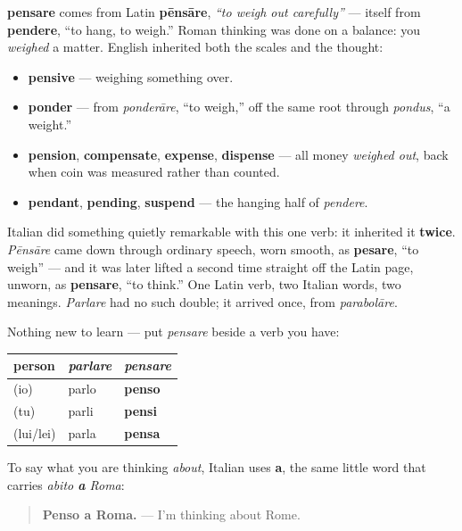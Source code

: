 \begin{cousinweb}
\textbf{pensare} comes from Latin \textbf{pēnsāre}, \emph{\textquotedblleft{}to weigh out carefully\textquotedblright{}} — itself from \textbf{pendere}, \textquotedblleft{}to hang, to weigh.\textquotedblright{} Roman thinking was done on a balance: you \emph{weighed} a matter. English inherited both the scales and the thought:

\begin{itemize}
\raggedright
  \item \textbf{pensive} — weighing something over.
  \item \textbf{ponder} — from \emph{ponderāre}, \textquotedblleft{}to weigh,\textquotedblright{} off the same root through \emph{pondus}, \textquotedblleft{}a weight.\textquotedblright{}
  \item \textbf{pension}, \textbf{compensate}, \textbf{expense}, \textbf{dispense} — all money \emph{weighed out}, back when coin was measured rather than counted.
  \item \textbf{pendant}, \textbf{pending}, \textbf{suspend} — the hanging half of \emph{pendere}.
\end{itemize}

Italian did something quietly remarkable with this one verb: it inherited it \textbf{twice}. \emph{Pēnsāre} came down through ordinary speech, worn smooth, as \textbf{pesare}, \textquotedblleft{}to weigh\textquotedblright{} — and it was later lifted a second time straight off the Latin page, unworn, as \textbf{pensare}, \textquotedblleft{}to think.\textquotedblright{} One Latin verb, two Italian words, two meanings. \emph{Parlare} had no such double; it arrived once, from \emph{parabolāre}.
\end{cousinweb}

\begin{grammarlens}[title={Grammar Lens: the same three endings}]
Nothing new to learn — put \emph{pensare} beside a verb you have:

\noindent
\begin{tabularx}{\linewidth}{@{}>{\raggedright\arraybackslash}X>{\raggedright\arraybackslash}X>{\raggedright\arraybackslash}X@{}}
\toprule
\textbf{person} & \textbf{\emph{parlare}} & \textbf{\emph{pensare}} \\
\midrule
(io) & parlo & \textbf{penso} \\
(tu) & parli & \textbf{pensi} \\
(lui/lei) & parla & \textbf{pensa} \\
\bottomrule
\end{tabularx}

To say what you are thinking \emph{about}, Italian uses \textbf{a}, the same little word that carries \emph{abito \textbf{a} Roma}:

\begin{quote}
\textbf{Penso a Roma.} — I'm thinking about Rome.
\end{quote}
\end{grammarlens}

